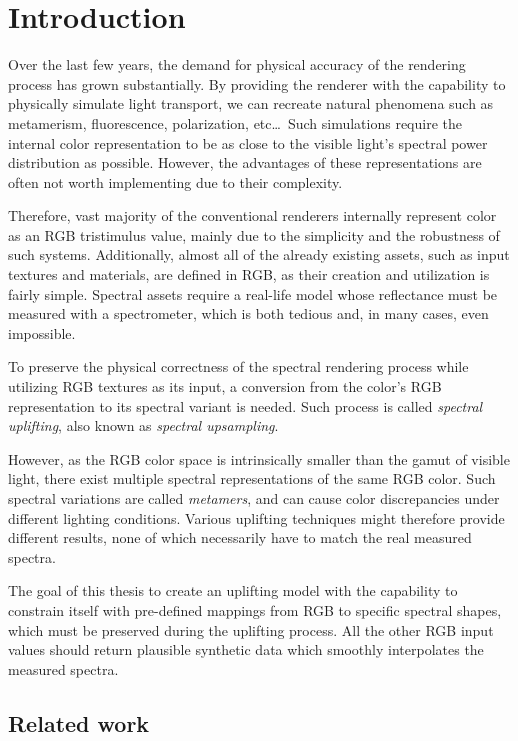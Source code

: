 \chapter*{Introduction}

Over the last few years, the demand for physical accuracy of the rendering process has grown substantially. By providing the renderer with the capability to physically simulate light transport, we can recreate natural phenomena such as metamerism, fluorescence, polarization, etc\ldots~Such simulations require the internal color representation to be as close to the visible light's spectral power distribution as possible. However, the advantages of these representations are often not worth implementing due to their complexity.

Therefore, vast majority of the conventional renderers internally represent color as an RGB tristimulus value, mainly due to the simplicity and the robustness of such systems. Additionally, almost all of the already existing assets, such as input textures and materials, are defined in RGB, as their creation and utilization is fairly simple. Spectral assets require a real-life model whose reflectance must be measured with a spectrometer, which is both tedious and, in many cases, even impossible.

To preserve the physical correctness of the spectral rendering process while utilizing RGB textures as its input, a conversion from the color's RGB representation to its spectral variant is needed. Such process is called \emph{spectral uplifting}, also known as \emph{spectral upsampling}.

However, as the RGB color space is intrinsically smaller than the gamut of visible light, there exist multiple spectral representations of the same RGB color. Such spectral variations are called \emph{metamers}, and can cause color discrepancies under different lighting conditions. Various uplifting techniques might therefore provide different results, none of which necessarily have to match the real measured spectra.

The goal of this thesis to create an uplifting model with the capability to constrain itself with pre-defined mappings from RGB to specific spectral shapes, which must be preserved during the uplifting process. All the other RGB input values should return plausible synthetic data which smoothly interpolates the measured spectra.
 
\section*{Related work}

